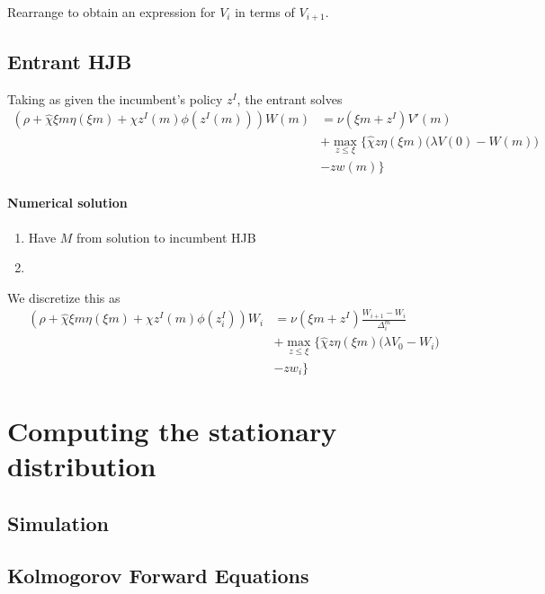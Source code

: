 \documentclass[12pt,english]{article}
\theoremstyle{remark}
\begin{document}
Rearrange to obtain an expression for $V_i$ in terms of $V_{i+1}$. 

\subsection{Entrant HJB}
Taking as given the incumbent's policy $z^I$, the entrant solves
\begin{align}
	(\rho + \hat{\chi} \xi m \eta (\xi m) + \chi z^I(m) \phi (z^I(m))) W(m) &= \nu (\xi m + z^I) V'(m) \nonumber \\
	&+ \max_{z \le \xi} \Big\{ \hat{\chi} z \eta (\xi m) \Big( \lambda V(0) - W(m) \Big) \nonumber \\
	&- zw(m) \Big\}
\end{align}

\paragraph{Numerical solution}
\begin{enumerate}
	\item Have $M$ from solution to incumbent HJB
	\item 
\end{enumerate}
We discretize this as 
\begin{align}
	(\rho + \hat{\chi} \xi m \eta (\xi m) + \chi z^I(m) \phi (z^I_i)) W_i &= \nu (\xi m + z^I) \frac{W_{i+1}-W_i}{\Delta^m_i} \nonumber \\
&+ \max_{z \le \xi} \Big\{ \hat{\chi} z \eta (\xi m) \Big( \lambda V_0 - W_i \Big) \nonumber \\
&- zw_i \Big\}
\end{align}


\section{Computing the stationary distribution}

\subsection{Simulation}

\subsection{Kolmogorov Forward Equations}
\end{document}
